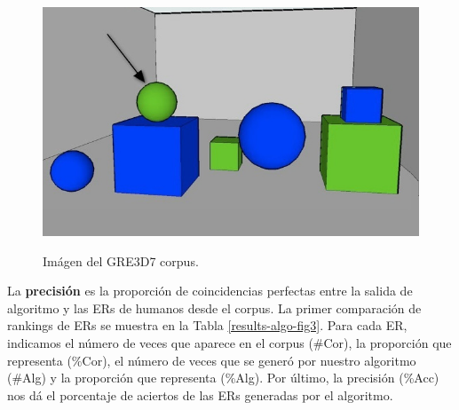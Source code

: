 \begin{figure}[!ht]
\centering
\includegraphics[width=.6\textwidth]{images/3.jpg}\\[0pt]
\caption{}
\label{fig-GRE3D7}
\caption{Im\'agen del GRE3D7 corpus.}\label{contexto-evaluacion}
\end{figure}

La \textbf{precisi\'on} es la proporci\'on de coincidencias perfectas entre la salida de algoritmo y las ERs de humanos desde el corpus. 
La primer comparaci\'on de rankings de ERs se muestra en la Tabla \ref{results-algo-fig3}. Para cada ER, indicamos el n\'umero de veces que aparece en el corpus (\#Cor), la proporci\'on que representa (\%Cor), el n\'umero de veces que se gener\'o por nuestro algoritmo (\#Alg) y la proporci\'on que representa (\%Alg).
Por \'ultimo, la precisi\'on (\%Acc) nos d\'a el porcentaje de aciertos de las ERs generadas por el algoritmo. 

